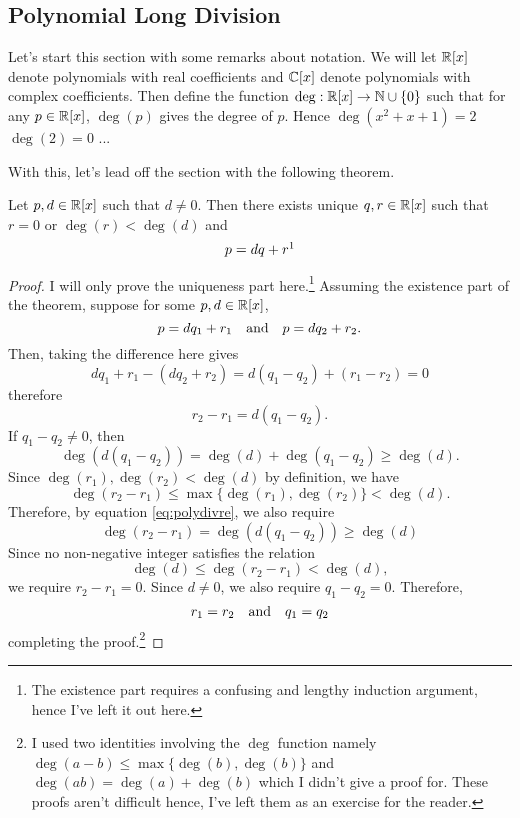 \subsection{Polynomial Long Division}
Let's start this section with some remarks about notation.
We will let $\mathbb{R}[x]$ denote polynomials with real coefficients and $\mathbb{C}[x]$ denote polynomials with complex coefficients.
Then define the function $\deg: \mathbb{R}[x] \to \mathbb{N}\cup\{0\}$ such that for any $p\in \mathbb{R}[x]$, $\deg(p)$ gives the degree of $p$.
Hence $\deg(x^2+x+1)=2$ $\deg(2)=0$ ...

With this, let's lead off the section with the following theorem.
\label{thm:polydiv}
\begin{theorem}
Let $p, d\in \mathbb{R}[x]$ such that $d \neq 0$. Then there exists unique $q,r \in \mathbb{R}[x]$ such that $r=0$ or $\deg(r)<\deg (d)$ and
$$p=dq + r\footnotemark$$
\end{theorem}
\begin{proof}
	I will only prove the uniqueness part here.\footnote{The existence part requires a confusing and lengthy induction argument, hence I've left it out here.}
	Assuming the existence part of the theorem, suppose for some $p,d\in\mathbb{R}[x]$,
	$$p=dq_1+r_1\quad\text{and}\quad p=dq_2 + r_2.$$
	Then, taking the difference here gives
	$$dq_1+r_1 - (dq_2 + r_2)=d(q_1-q_2)+(r_1-r_2)=0$$
	therefore
	$$r_2-r_1 = d(q_1-q_2).$$
	If $q_1-q_2\neq 0$, then
	\begin{equation}
		\deg(d(q_1-q_2))=\deg(d)+\deg(q_1-q_2) \ge \deg (d).
		\label{eq:polydivre}
	\end{equation}
	Since $\deg(r_1),\deg(r_2)<\deg(d)$ by definition, we have
	$$\deg(r_2-r_1)\le \max\{\deg(r_1),\deg(r_2)\} <\deg (d).$$
	Therefore, by equation \eqref{eq:polydivre}, we also require
	$$\deg(r_2-r_1)=\deg(d(q_1-q_2))\ge \deg (d)$$
	Since no non-negative integer satisfies the relation 
	$$\deg(d)\le \deg(r_2-r_1)<\deg(d),$$
	we require $r_2-r_1=0$.
	Since $d\neq 0$, we also require $q_1-q_2=0$.
	Therefore,
	$$r_1=r_2 \quad\text{and}\quad q_1=q_2$$
	completing the proof.\footnote{I used two identities involving the $\deg$ function namely $\deg(a-b)\le \max\{\deg(b),\deg(b)\}$ and $\deg(ab)=\deg(a)+\deg(b)$ which I didn't give a proof for. These proofs aren't difficult hence, I've left them as an exercise for the reader.}
\end{proof}

